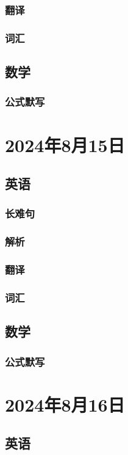 \documentclass[UTF8]{ctexart}
\begin{document}
\subsubsection{翻译}
\subsubsection{词汇}
\subsection{数学}
\subsubsection{公式默写}
\begin{multicols}{2}
\end{multicols}
\section{2024年8月15日}
\subsection{英语}
\subsubsection{长难句}
\subsubsection{解析}
\subsubsection{翻译}
\subsubsection{词汇}
\subsection{数学}
\subsubsection{公式默写}
\begin{multicols}{2}
\end{multicols}
\section{2024年8月16日}
\subsection{英语}
\end{document}
